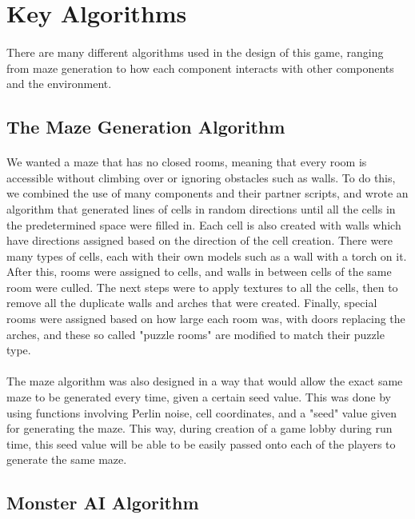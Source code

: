 \documentclass[12pt, titlepage]{article}
\begin{document}
\section{Key Algorithms}
\paragraph{}There are many different algorithms used in the design of this game, ranging from maze generation to how each component interacts with other components and the environment. 
\subsection{The Maze Generation Algorithm}
\paragraph{}We wanted a maze that has no closed rooms, meaning that every room is accessible without climbing over or ignoring obstacles such as walls. To do this, we combined the use of many components and their partner scripts, and wrote an algorithm that generated lines of cells in random directions until all the cells in the predetermined space were filled in. Each cell is also created with walls which have directions assigned based on the direction of the cell creation. There were many types of cells, each with their own models such as a wall with a torch on it. After this, rooms were assigned to cells, and walls in between cells of the same room were culled. The next steps were to apply textures to all the cells, then to remove all the duplicate walls and arches that were created. Finally, special rooms were assigned based on how large each room was, with doors replacing the arches, and these so called "puzzle rooms" are modified to match their puzzle type. 
\paragraph{}The maze algorithm was also designed in a way that would allow the exact same maze to be generated every time, given a certain seed value. This was done by using functions involving Perlin noise, cell coordinates, and a "seed" value given for generating the maze. This way, during creation of a game lobby during run time, this seed value will be able to be easily passed onto each of the players to generate the same maze. 

\subsection{Monster AI Algorithm}
\end{document}
